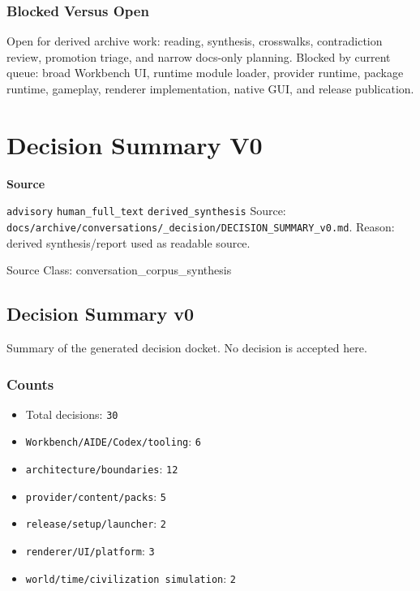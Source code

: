 \documentclass[9pt,a4paper,openany]{book}
\newcommand{\vonecallout}[3]{\par\medskip\noindent\begingroup\setlength{\fboxsep}{7pt}\colorbox{DomCalloutBg}{\parbox{0.94\linewidth}{\textbf{\textcolor{#1}{#2}}\par #3}}\endgroup\par\medskip}
\begin{document}
\subsubsection{Blocked Versus Open}

Open for derived archive work: reading, synthesis, crosswalks, contradiction review, promotion triage, and narrow docs-\allowbreak{}only planning.\allowbreak{} Blocked by current queue: broad Workbench UI, runtime module loader, provider runtime, package runtime, gameplay, renderer implementation, native GUI, and release publication.\allowbreak{}




\section{Decision Summary V0}

\vonecallout{DomSlate}{Source}{\texttt{advisory} \texttt{human\_\allowbreak{}full\_\allowbreak{}text} \texttt{derived\_\allowbreak{}synthesis} Source: \texttt{docs/\allowbreak{}archive/\allowbreak{}conversations/\allowbreak{}\_\allowbreak{}decision/\allowbreak{}DECISION\_\allowbreak{}SUMMARY\_\allowbreak{}v0.\allowbreak{}md}.\allowbreak{} Reason: derived synthesis/\allowbreak{}report used as readable source.\allowbreak{}}

Source Class: conversation\_\allowbreak{}corpus\_\allowbreak{}synthesis



\subsection{Decision Summary v0}

Summary of the generated decision docket.\allowbreak{} No decision is accepted here.\allowbreak{}


\subsubsection{Counts}

\begin{itemize}
\item Total decisions: \texttt{30}
\item \texttt{Workbench/\allowbreak{}AIDE/\allowbreak{}Codex/\allowbreak{}tooling}: \texttt{6}
\item \texttt{architecture/\allowbreak{}boundaries}: \texttt{12}
\item \texttt{provider/\allowbreak{}content/\allowbreak{}packs}: \texttt{5}
\item \texttt{release/\allowbreak{}setup/\allowbreak{}launcher}: \texttt{2}
\item \texttt{renderer/\allowbreak{}UI/\allowbreak{}platform}: \texttt{3}
\item \texttt{world/\allowbreak{}time/\allowbreak{}civilization simulation}: \texttt{2}
\end{itemize}
\end{document}
